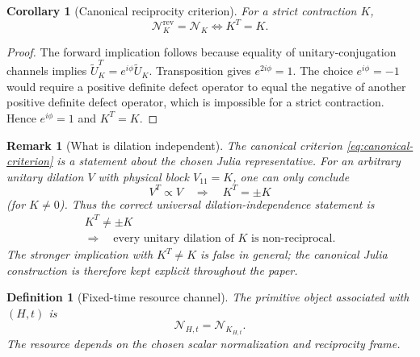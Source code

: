 \documentclass[reprint,amsmath,amssymb,aps,nofootinbib]{revtex4-2}
\newtheorem{definition}{Definition}
\newtheorem{corollary}{Corollary}
\newtheorem{remark}{Remark}
\newcommand{\rev}{\mathrm{rev}}
\begin{document}
\begin{corollary}[Canonical reciprocity criterion]
For a strict contraction $K$,
\begin{equation}
\boxed{
\mathcal N_K^{\rev}=\mathcal N_K
\iff K^T=K.
}
\label{eq:canonical-criterion}
\end{equation}
\end{corollary}

\begin{proof}
The forward implication follows because equality of unitary-conjugation channels implies
$\widetilde U_K^T=e^{i\phi}\widetilde U_K$. Transposition gives $e^{2i\phi}=1$. The choice
$e^{i\phi}=-1$ would require a positive definite defect operator to equal the negative of another
positive definite defect operator, which is impossible for a strict contraction. Hence $e^{i\phi}=1$
and $K^T=K$.
\end{proof}

\begin{remark}[What is dilation independent]
The canonical criterion \eqref{eq:canonical-criterion} is a statement about the chosen Julia
representative. For an \emph{arbitrary} unitary dilation $V$ with physical block $V_{11}=K$, one
can only conclude
\begin{equation}
V^T\propto V\quad\Longrightarrow\quad K^T=\pm K
\end{equation}
(for $K\ne0$). Thus the correct universal dilation-independence statement is
\begin{equation}
\boxed{\begin{gathered}
K^T\ne\pm K\\[-1mm]
\Longrightarrow\quad
\text{every unitary dilation of }K\text{ is non-reciprocal}.
\end{gathered}}
\end{equation}
The stronger implication with $K^T\ne K$ is false in general; the canonical Julia construction
is therefore kept explicit throughout the paper.
\end{remark}

\begin{definition}[Fixed-time resource channel]
The primitive object associated with $(H,t)$ is
\begin{equation}
\boxed{\mathcal N_{H,t}=\mathcal N_{K_{H,t}}.}
\end{equation}
The resource depends on the chosen scalar normalization and reciprocity frame.
\end{definition}

\end{document}
